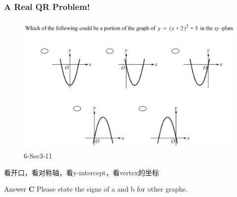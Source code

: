 \documentclass[
	11pt, %
]{beamer}
\begin{document}
\begin{frame}
	\frametitle{A Real QR Problem!}
	\framesubtitle{}

	\begin{figure}
		\includegraphics[width=\linewidth]{Parabola_Example_Question1.png}
		\caption{6-Sec3-11}
	\end{figure}

	\pause

看开口，看对称轴，看y-intercept，看vertex的坐标 \\

\pause

\bigskip
Answer \textbf{C } \pause Please state the signs of a and b for other graphs.

\end{frame}

\end{document}
